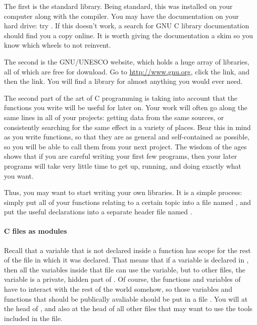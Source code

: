 \documentclass[12pt]{article}
\begin{document}
The first is the standard library. Being standard, this was
installed on your computer along with the compiler. You may have the
documentation on your hard drive: try . If this doesn't
work, a search for GNU C library documentation should find you a copy
online. It is worth giving the documentation a skim so you know which
wheels to not reinvent.

The second is the GNU/UNESCO website, which holds a huge
array of libraries, all of which are free for download. Go to
\url{http://www.gnu.org}, click the  link, and then
the  link. You will find a library for almost
anything you would ever need.

The second part of the art of C programming is taking into account that
the functions you write will be useful for later on. Your work will often
go along the same lines in all of your projects: getting data from the
same sources, or consistently searching for the same effect in a
variety of places. Bear this in mind as you write functions, so that they
are as general and self-contained as possible, so you will be able to call
them from your next project. The wisdom of the ages shows that if you are
careful writing your first few programs, then your later programs will
take very little time to get up, running, and doing exactly what you want.

Thus, you may want to start writing your own libraries. It is a simple
process: simply put all of your functions relating to a certain topic
into a file named , and put the useful declarations into a separate header file named . 


\paragraph{C files as modules}
Recall that a variable that is not declared inside a function has scope
for the rest of the file in which it was declared. That means that if a
variable is declared in , then all the variables inside
that file can use the variable, but to other  files, the
variable is a private, hidden part of . Of course, the
functions and variables of  have to interact with the
rest of the world somehow, so those variables and functions that should
be publically avaliable should be put in a file . You
will  at the head of ,
and also at the head of all other files that may want to use the tools
included in the  file.
\end{document}
